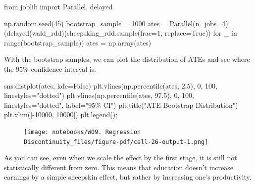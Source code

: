 \documentclass[
  letterpaper,
  DIV=11,
  numbers=noendperiod]{scrreprt}
\newenvironment{Shaded}{\begin{snugshade}}{\end{snugshade}}
\newcommand{\BuiltInTok}[1]{\textcolor[rgb]{0.00,0.23,0.31}{#1}}
\newcommand{\ControlFlowTok}[1]{\textcolor[rgb]{0.00,0.23,0.31}{#1}}
\newcommand{\DecValTok}[1]{\textcolor[rgb]{0.68,0.00,0.00}{#1}}
\newcommand{\FloatTok}[1]{\textcolor[rgb]{0.68,0.00,0.00}{#1}}
\newcommand{\ImportTok}[1]{\textcolor[rgb]{0.00,0.46,0.62}{#1}}
\newcommand{\KeywordTok}[1]{\textcolor[rgb]{0.00,0.23,0.31}{#1}}
\newcommand{\NormalTok}[1]{\textcolor[rgb]{0.00,0.23,0.31}{#1}}
\newcommand{\OperatorTok}[1]{\textcolor[rgb]{0.37,0.37,0.37}{#1}}
\newcommand{\StringTok}[1]{\textcolor[rgb]{0.13,0.47,0.30}{#1}}
\newcommand{\VariableTok}[1]{\textcolor[rgb]{0.07,0.07,0.07}{#1}}
\begin{document}
\begin{Shaded}
\begin{Highlighting}[]
\ImportTok{from}\NormalTok{ joblib }\ImportTok{import}\NormalTok{ Parallel, delayed }

\NormalTok{np.random.seed(}\DecValTok{45}\NormalTok{)}
\NormalTok{bootstrap\_sample }\OperatorTok{=} \DecValTok{1000}
\NormalTok{ates }\OperatorTok{=}\NormalTok{ Parallel(n\_jobs}\OperatorTok{=}\DecValTok{4}\NormalTok{)(delayed(wald\_rdd)(sheepsking\_rdd.sample(frac}\OperatorTok{=}\DecValTok{1}\NormalTok{, replace}\OperatorTok{=}\VariableTok{True}\NormalTok{))}
                          \ControlFlowTok{for}\NormalTok{ \_ }\KeywordTok{in} \BuiltInTok{range}\NormalTok{(bootstrap\_sample))}
\NormalTok{ates }\OperatorTok{=}\NormalTok{ np.array(ates)}
\end{Highlighting}
\end{Shaded}

With the bootstrap samples, we can plot the distribution of ATEs and see
where the 95\% confidence interval is.

\begin{Shaded}
\begin{Highlighting}[]
\NormalTok{sns.distplot(ates, kde}\OperatorTok{=}\VariableTok{False}\NormalTok{)}
\NormalTok{plt.vlines(np.percentile(ates, }\FloatTok{2.5}\NormalTok{), }\DecValTok{0}\NormalTok{, }\DecValTok{100}\NormalTok{, linestyles}\OperatorTok{=}\StringTok{"dotted"}\NormalTok{)}
\NormalTok{plt.vlines(np.percentile(ates, }\FloatTok{97.5}\NormalTok{), }\DecValTok{0}\NormalTok{, }\DecValTok{100}\NormalTok{, linestyles}\OperatorTok{=}\StringTok{"dotted"}\NormalTok{, label}\OperatorTok{=}\StringTok{"95\% CI"}\NormalTok{)}
\NormalTok{plt.title(}\StringTok{"ATE Bootstrap Distribution"}\NormalTok{)}
\NormalTok{plt.xlim([}\OperatorTok{{-}}\DecValTok{10000}\NormalTok{, }\DecValTok{10000}\NormalTok{])}
\NormalTok{plt.legend()}\OperatorTok{;}
\end{Highlighting}
\end{Shaded}

\begin{figure}[H]

{\centering \texttt{[image: notebooks/W09. Regression Discontinuity\_files/figure-pdf/cell-26-output-1.png]}

}

\end{figure}

As you can see, even when we scale the effect by the first stage, it is
still not statistically different from zero. This means that education
doesn't increase earnings by a simple sheepskin effect, but rather by
increasing one's productivity.
\end{document}
